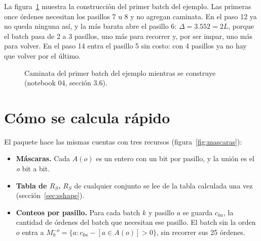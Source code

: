 \documentclass[11pt,a4paper,oneside]{report}
\newcommand{\RS}{R_S}
\begin{document}
La figura~\ref{fig:traza} muestra la construcción del primer batch del ejemplo. Las primeras
once órdenes necesitan los pasillos 7 u 8 y no agregan caminata. En el paso 12 ya no queda
ninguna así, y la más barata abre el pasillo 6: $\Delta = 3.552 = 2L$, porque el batch pasa de
2 a 3 pasillos, uno más para recorrer y, por ser impar, uno más para volver. En el paso 14
entra el pasillo 5 sin costo: con 4 pasillos ya no hay que volver por el último.

\begin{figure}[ht]
\centering
{}
\caption{Caminata del primer batch del ejemplo mientras se construye (notebook 04,
sección 3.6).}
\label{fig:traza}
\end{figure}

\section{Cómo se calcula rápido}

El paquete hace las mismas cuentas con tres recursos (figura~\ref{fig:mascaras}):

\begin{itemize}
  \item \textbf{Máscaras.} Cada $A(o)$ es un entero con un bit por pasillo, y la unión es el
        \emph{o} bit a bit.
  \item \textbf{Tabla de $\RS$.} $\RS$ de cualquier conjunto se lee de la tabla calculada una
        vez (sección~\ref{sec:sshape}).
  \item \textbf{Conteos por pasillo.} Para cada batch $k$ y pasillo $a$ se guarda $c_{ka}$, la
        cantidad de órdenes del batch que necesitan ese pasillo. El batch sin la orden $o$
        entra a $M_k^{-o} = \{a : c_{ka} - [a \in A(o)] > 0\}$, sin recorrer sus 25 órdenes.
\end{itemize}
\end{document}
